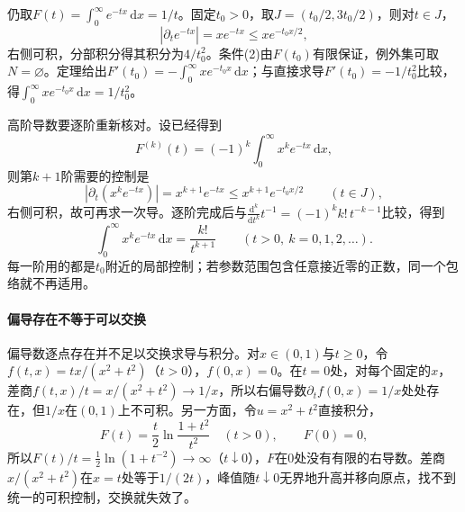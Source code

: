 \begin{example}[对$e^{-tx}$在积分号下逐阶求导]
\label{ex:integral-differentiate-exponential}
仍取$F(t)=\int_0^\infty e^{-tx}\,\mathrm dx=1/t$。固定$t_0>0$，取$J=(t_0/2,3t_0/2)$，则对$t\in J$，
\[
 |\partial_te^{-tx}|=xe^{-tx}\le xe^{-t_0x/2},
\]
右侧可积，分部积分得其积分为$4/t_0^2$。条件(2)由$F(t_0)$有限保证，例外集可取$N=\varnothing$。定理给出$F'(t_0)=-\int_0^\infty xe^{-t_0x}\,\mathrm dx$；与直接求导$F'(t_0)=-1/t_0^2$比较，得$\int_0^\infty xe^{-t_0x}\,\mathrm dx=1/t_0^2$。

高阶导数要逐阶重新核对。设已经得到
\[
 F^{(k)}(t)=(-1)^k\int_0^\infty x^ke^{-tx}\,\mathrm dx,
\]
则第$k+1$阶需要的控制是
\[
 |\partial_t(x^ke^{-tx})|=x^{k+1}e^{-tx}\le x^{k+1}e^{-t_0x/2}\qquad(t\in J),
\]
右侧可积，故可再求一次导。逐阶完成后与$\frac{\mathrm d^k}{\mathrm dt^k}t^{-1}=(-1)^kk!\,t^{-k-1}$比较，得到
\[
 \int_0^\infty x^ke^{-tx}\,\mathrm dx=\frac{k!}{t^{k+1}}\qquad(t>0,\ k=0,1,2,\ldots).
\]
每一阶用的都是$t_0$附近的局部控制；若参数范围包含任意接近零的正数，同一个包络就不再适用。
\end{example}

\paragraph{偏导存在不等于可以交换}
偏导数逐点存在并不足以交换求导与积分。对$x\in(0,1)$与$t\ge0$，令$f(t,x)=tx/(x^2+t^2)$（$t>0$），$f(0,x)=0$。在$t=0$处，对每个固定的$x$，差商$f(t,x)/t=x/(x^2+t^2)\to1/x$，所以右偏导数$\partial_tf(0,x)=1/x$处处存在，但$1/x$在$(0,1)$上不可积。另一方面，令$u=x^2+t^2$直接积分，
\[
 F(t)=\frac t2\ln\frac{1+t^2}{t^2}\quad(t>0),\qquad F(0)=0,
\]
所以$F(t)/t=\frac12\ln(1+t^{-2})\to\infty$（$t\downarrow0$），$F$在$0$处没有有限的右导数。差商$x/(x^2+t^2)$在$x=t$处等于$1/(2t)$，峰值随$t\downarrow0$无界地升高并移向原点，找不到统一的可积控制，交换就失效了。
